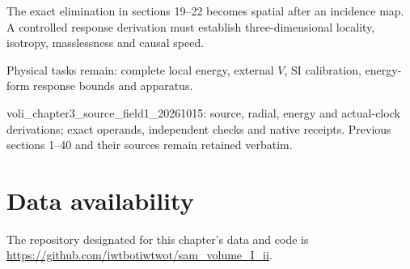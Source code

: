 \documentclass[10pt,twocolumn,letterpaper]{article}
\begin{document}
The exact elimination in sections 19--22 becomes spatial after an incidence map. A controlled response derivation must establish three-dimensional locality, isotropy, masslessness and causal speed.

Physical tasks remain: complete local energy, external \(V\), SI calibration, energy-form response bounds and apparatus.

\begingroup\footnotesize\raggedright
\noindent[13] voli\_chapter3\_source\_field1\_20261015: source, radial, energy and actual-clock derivations; exact operands, independent checks and native receipts. Previous sections 1--40 and their sources remain retained verbatim.

\par\endgroup

\section*{Data availability}
The repository designated for this chapter's data and code is
\url{https://github.com/iwtbotiwtwot/sam_volume_I_ii}.
\end{document}
